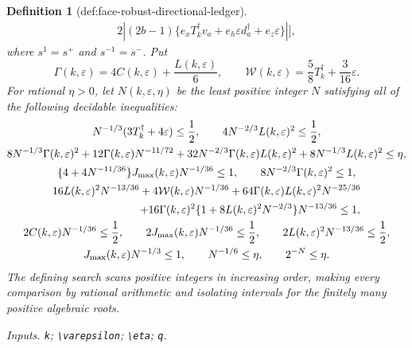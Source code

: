 \documentclass{article}
\newtheorem{definition}{Definition}
\begin{document}
\begin{definition}[def:face-robust-directional-ledger]
\[\begin{aligned}
2\left|(2b-1)
\{e_xT_k^\dagger v_a+e_h\varepsilon d_a^\dagger
+e_z\varepsilon\}\right|\Bigg],
\end{aligned}
\]
where \(s^1=s^+\) and \(s^{-1}=s^-\).  Put
\[
\Gamma(k,\varepsilon)=4C(k,\varepsilon)+\frac{L(k,\varepsilon)}6,
\qquad
\mathcal W(k,\varepsilon)=\frac58T_k^\dagger+\frac3{16}\varepsilon.
\]
For rational \(\eta>0\), let \(N(k,\varepsilon,\eta)\) be the least positive integer \(N\) satisfying all of the following decidable inequalities:
\[
\begin{gathered}
N^{-1/3}(3T_k^\dagger+4\varepsilon)\le\frac12,
\qquad
4N^{-2/3}L(k,\varepsilon)^2\le\frac12,\\
8N^{-1/3}\Gamma(k,\varepsilon)^2
+12\Gamma(k,\varepsilon)N^{-11/72}
+32N^{-2/3}\Gamma(k,\varepsilon)L(k,\varepsilon)^2
+8N^{-1/3}L(k,\varepsilon)^2\le\eta,\\
\{4+4N^{-11/36}\}J_{\max}(k,\varepsilon)N^{-1/36}\le1,
\qquad
8N^{-2/3}\Gamma(k,\varepsilon)^2\le1,\\
16L(k,\varepsilon)^2N^{-13/36}
+4\mathcal W(k,\varepsilon)N^{-1/36}
+64\Gamma(k,\varepsilon)L(k,\varepsilon)^2N^{-25/36}\\
\hspace{28mm}
+16\Gamma(k,\varepsilon)^2
\{1+8L(k,\varepsilon)^2N^{-2/3}\}N^{-13/36}\le1,\\
2C(k,\varepsilon)N^{-1/36}\le\frac12,
\qquad
2J_{\max}(k,\varepsilon)N^{-1/36}\le\frac12,
\qquad
2L(k,\varepsilon)^2N^{-13/36}\le\frac12,\\
J_{\max}(k,\varepsilon)N^{-1/3}\le1,
\qquad N^{-1/6}\le\eta,
\qquad 2^{-N}\le\eta.
\end{gathered}
\]
The defining search scans positive integers in increasing order, making every comparison by rational arithmetic and isolating intervals for the finitely many positive algebraic roots.
\par\smallskip\noindent\emph{Inputs.} \texttt{k}; \texttt{\textbackslash{}\allowbreak{}varepsilon}; \texttt{\textbackslash{}\allowbreak{}eta}; \texttt{q}.
\end{definition}
\end{document}
